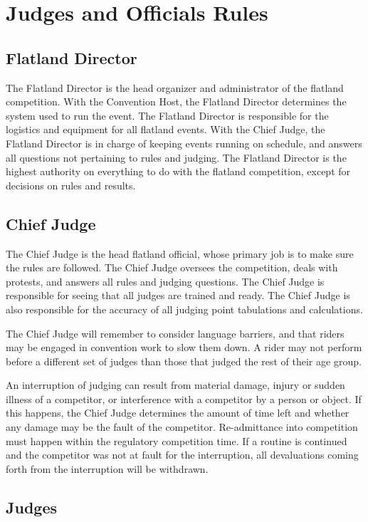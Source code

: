 \chapter{Judges and Officials Rules}

\section{Flatland Director}

The Flatland Director is the head organizer and administrator of the flatland competition.
With the Convention Host, the Flatland Director determines the system used to run the event.
The Flatland Director is responsible for the logistics and equipment for all flatland events.
With the Chief Judge, the Flatland Director is in charge of keeping events running on schedule, and answers all questions not pertaining to rules and judging.
The Flatland Director is the highest authority on everything to do with the flatland competition, except for decisions on rules and results.

\section{Chief Judge}

The Chief Judge is the head flatland official, whose primary job is to make sure the rules are followed.
The Chief Judge oversees the competition, deals with protests, and answers all rules and judging questions.
The Chief Judge is responsible for seeing that all judges are trained and ready.
The Chief Judge is also responsible for the accuracy of all judging point tabulations and calculations.


The Chief Judge will remember to consider language barriers, and that riders may be engaged in convention work to slow them down.
A rider may not perform before a different set of judges than those that judged the rest of their age group.

An interruption of judging can result from material damage, injury or sudden illness of a competitor, or interference with a competitor by a person or object.
If this happens, the Chief Judge determines the amount of time left and whether any damage may be the fault of the competitor.
Re-admittance into competition must happen within the regulatory competition time.
If a routine is continued and the competitor was not at fault for the interruption, all devaluations coming forth from the interruption will be withdrawn.

\section{Judges}


